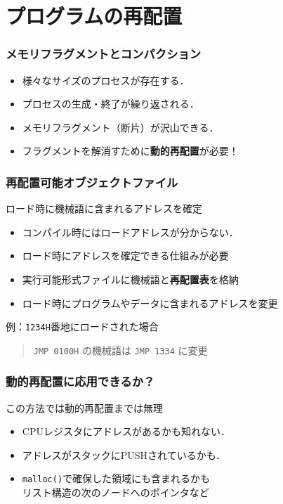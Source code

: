 \documentclass[unicode]{beamer}                   %
\begin{document}
\section{プログラムの再配置}
\begin{frame}
  \frametitle{メモリフラグメントとコンパクション}
  \begin{itemize}
    \item 様々なサイズのプロセスが存在する．
    \item プロセスの生成・終了が繰り返される．
    \item メモリフラグメント（断片）が沢山できる．
    \item フラグメントを解消すために{\bf 動的再配置}が必要！
  \end{itemize}
\end{frame}

\begin{frame}
  \frametitle{再配置可能オブジェクトファイル}
  ロード時に機械語に含まれるアドレスを確定
  \begin{itemize}
    \item コンパイル時にはロードアドレスが分からない．
    \item ロード時にアドレスを確定できる仕組みが必要
    \item 実行可能形式ファイルに機械語と{\bf 再配置表}を格納
    \item ロード時にプログラムやデータに含まれるアドレスを変更
  \end{itemize}
  \vfill
    例：{\tt 1234H}番地にロードされた場合\\
    \begin{quote}
    {\tt JMP 0100H} の機械語は {\tt JMP 1334} に変更
    \end{quote}
\end{frame}

\begin{frame}
  \frametitle{動的再配置に応用できるか？}
    この方法では動的再配置までは無理
  \begin{itemize}
    \item CPUレジスタにアドレスがあるかも知れない．
    \item アドレスがスタックにPUSHされているかも．
    \item {\tt malloc()}で確保した領域にも含まれるかも\\
      リスト構造の次のノードへのポインタなど
  \end{itemize}
\end{frame}
\end{document}
